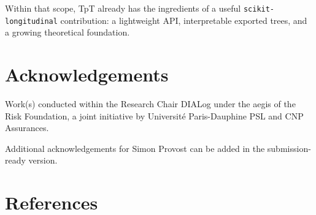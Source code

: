 \documentclass[
]{article}
\begin{document}
Within that scope, TpT already has the ingredients of a useful
\texttt{scikit-longitudinal} contribution: a lightweight API,
interpretable exported trees, and a growing theoretical foundation.

\section{Acknowledgements}\label{acknowledgements}

Work(s) conducted within the Research Chair DIALog under the aegis of
the Risk Foundation, a joint initiative by Université Paris-Dauphine PSL
and CNP Assurances.

Additional acknowledgements for Simon Provost can be added in the
submission-ready version.

\section*{References}\label{references}
\end{document}
